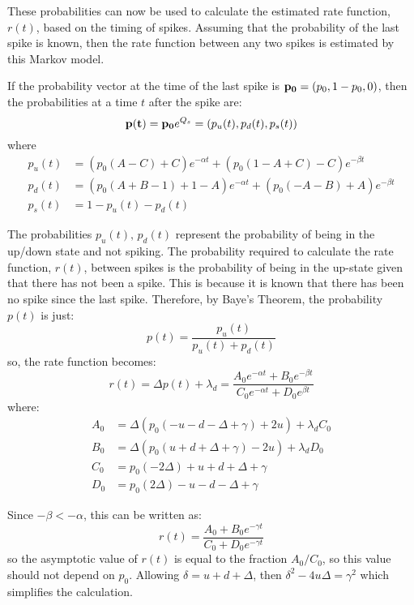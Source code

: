 These probabilities can now be used to calculate the estimated rate function, $r(t)$, based on the timing of spikes.  Assuming that the probability of the last spike is known, then the rate function between any two spikes is estimated by this Markov model. 

If the probability vector at the time of the last spike is ${\bf p_0}=(p_0, 1-p_0,0)$, then the probabilities at a time $t$ after the spike are:
\begin{equation}
{\bf p(t)} = {\bf p_0}e^{Q_s} = (p_u(t),p_d(t),p_s(t))
\end{equation}
where
\begin{equation}
\begin{split}
p_u(t) &= (p_0(A-C)+C)e^{-\alpha t}+(p_0(1-A+C)-C)e^{-\beta t}\\
p_d(t) &= (p_0(A+B-1)+1-A)e^{-\alpha t}+(p_0(-A-B)+A)e^{-\beta t}\\
p_s(t) &= 1 - p_u(t) - p_d(t)
\end{split}
\end{equation}

The probabilities $p_u(t), \,p_d(t)$ represent the probability of being in the up/down state and not spiking.  The probability required to calculate the rate function, $r(t)$, between spikes is the probability of being in the up-state given that there has not been a spike.  This is because it is known that there has been no spike since the last spike.  Therefore, by Baye's Theorem, the probability $p(t)$ is just:
\begin{equation}
p(t)  = \frac{p_u(t)}{p_u(t) + p_d(t)}
\end{equation}
so, the rate function becomes:
\begin{equation}\label{roft}
r(t) = \Delta p(t) + \lambda_d = \frac{A_0e^{-\alpha t}+B_0e^{-\beta t}}{C_0e^{-\alpha t} + D_0e^{\beta t}}
\end{equation}
where:
\begin{equation}
\begin{split}
\label{abcd}
A_0 & = \Delta(p_0(-u-d-\Delta + \gamma)+2u)+\lambda_dC_0\\
B_0 & =\Delta(p_0(u+d+\Delta + \gamma)-2u)+\lambda_dD_0\\
C_0 & = p_0(-2\Delta)+u+d+\Delta+\gamma\\
D_0 & = p_0(2\Delta) -u-d-\Delta + \gamma
\end{split}
\end{equation}

Since $-\beta<-\alpha$, this can be written as:
\begin{equation}
r(t) = \frac{A_0+B_0e^{-\gamma t}}{C_0 + D_0e^{-\gamma t}}
\end{equation}
so the asymptotic value of $r(t)$ is equal to the fraction $A_0/C_0$, so this value should not depend on $p_0$.  Allowing $\delta=u+d+\Delta$, then $\delta^2 -4u\Delta= \gamma^2$ which simplifies the calculation.

